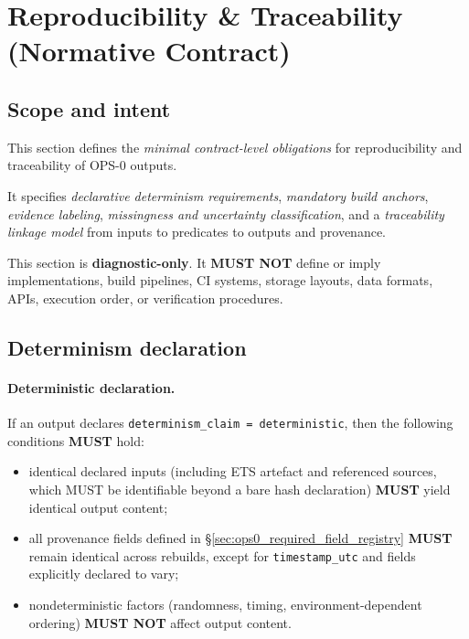 ﻿\section{Reproducibility \& Traceability (Normative Contract)}
\label{sec:ops0_repro_trace}

\subsection{Scope and intent}
This section defines the \emph{minimal contract-level obligations}
for reproducibility and traceability of OPS-0 outputs.

It specifies \emph{declarative determinism requirements},
\emph{mandatory build anchors},
\emph{evidence labeling},
\emph{missingness and uncertainty classification},
and a \emph{traceability linkage model}
from inputs to predicates to outputs and provenance.

This section is \textbf{diagnostic-only}.
It \textbf{MUST NOT} define or imply implementations,
build pipelines, CI systems, storage layouts,
data formats, APIs, execution order,
or verification procedures.

\subsection{Determinism declaration}
\paragraph{Deterministic declaration.}
If an output declares
\texttt{determinism\_claim = deterministic},
then the following conditions \textbf{MUST} hold:

\begin{itemize}
  \item identical declared inputs
        (including ETS artefact and referenced sources,
        which MUST be identifiable beyond a bare hash declaration)
        \textbf{MUST} yield identical output content;
  \item all provenance fields defined in
        \S\ref{sec:ops0_required_field_registry}
        \textbf{MUST} remain identical across rebuilds,
        except for \texttt{timestamp\_utc}
        and fields explicitly declared to vary;
  \item nondeterministic factors
        (randomness, timing, environment-dependent ordering)
        \textbf{MUST NOT} affect output content.
\end{itemize}

